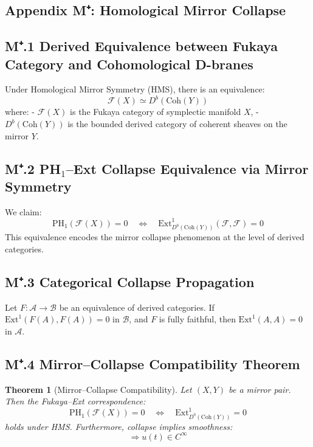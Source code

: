 \documentclass[11pt]{article}
\newtheorem{theorem}{Theorem}[section]
\begin{document}
\begin{axiom}
\begin{axiom}
{{%

\section*{Appendix M⁺: Homological Mirror Collapse}

\subsection*{M⁺.1 Derived Equivalence between Fukaya Category and Cohomological D-branes}

Under Homological Mirror Symmetry (HMS), there is an equivalence:
\[
\mathcal{F}(X) \simeq D^b(\text{Coh}(Y))
\]
where:
- $\mathcal{F}(X)$ is the Fukaya category of symplectic manifold $X$,
- $D^b(\text{Coh}(Y))$ is the bounded derived category of coherent sheaves on the mirror $Y$.

\subsection*{M⁺.2 PH$_1$–Ext Collapse Equivalence via Mirror Symmetry}

We claim:
\[
\mathrm{PH}_1(\mathcal{F}(X)) = 0 \quad \Longleftrightarrow \quad \mathrm{Ext}^1_{D^b(\text{Coh}(Y))}(\mathcal{F}, \mathcal{F}) = 0
\]
This equivalence encodes the mirror collapse phenomenon at the level of derived categories.

\subsection*{M⁺.3 Categorical Collapse Propagation}

Let $F: \mathcal{A} \to \mathcal{B}$ be an equivalence of derived categories.  
If $\mathrm{Ext}^1(F(A), F(A)) = 0$ in $\mathcal{B}$, and $F$ is fully faithful,  
then $\mathrm{Ext}^1(A, A) = 0$ in $\mathcal{A}$.

\subsection*{M⁺.4 Mirror–Collapse Compatibility Theorem}

\begin{theorem}[Mirror–Collapse Compatibility]
Let $(X,Y)$ be a mirror pair.  
Then the Fukaya–Ext correspondence:
\[
\mathrm{PH}_1(\mathcal{F}(X)) = 0 \quad \Leftrightarrow \quad \mathrm{Ext}^1_{D^b(\text{Coh}(Y))} = 0
\]
holds under HMS. Furthermore, collapse implies smoothness:
\[
\Rightarrow u(t) \in C^\infty
\]
\end{theorem}

}}
\end{axiom}
\end{axiom}
\end{document}
